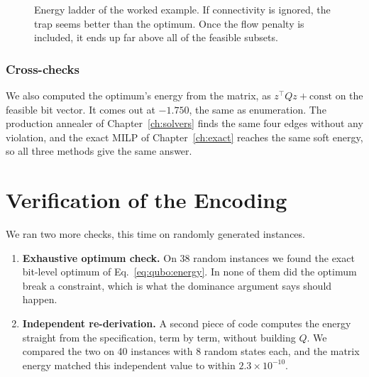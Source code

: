 \begin{figure}[htbp]
\centering
{}
\caption[Energy ladder of the worked example.]{Energy ladder of the worked example. If connectivity is ignored,
the trap seems better than the optimum. Once the flow penalty is included, it
ends up far above all of the feasible subsets.}
\label{fig:qubo:ladder}
\end{figure}

\subsubsection{Cross-checks} We also computed the optimum's energy from the
matrix, as $z^{\top}Qz+\mathrm{const}$ on the feasible bit vector. It comes
out at $-1.750$, the same as enumeration. The production annealer of
Chapter~\ref{ch:solvers} finds the same four edges without any violation, and
the exact MILP of Chapter~\ref{ch:exact} reaches the same soft energy, so all
three methods give the same answer.

\section{Verification of the Encoding}
\label{sec:qubo:verify}

We ran two more checks, this time on randomly generated instances.

\begin{enumerate}[label=\arabic*.]
\item \textbf{Exhaustive optimum check.} On 38 random instances we found the
exact bit-level optimum of Eq.~\eqref{eq:qubo:energy}. In none of them did the
optimum break a constraint, which is what the dominance argument says should
happen.
\item \textbf{Independent re-derivation.} A second piece of code computes the
energy straight from the specification, term by term, without building $Q$.
We compared the two on 40 instances with 8 random states each, and the matrix
energy matched this independent value to within $2.3\times10^{-10}$.
\end{enumerate}

